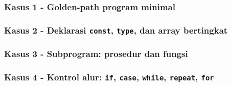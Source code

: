 \documentclass[11pt,a4paper]{article}
\begin{document}
\subsubsection*{Kasus 1 - Golden-path program minimal}





\subsubsection*{Kasus 2 - Deklarasi \texttt{const}, \texttt{type}, dan array bertingkat}





\subsubsection*{Kasus 3 - Subprogram: prosedur dan fungsi}





\subsubsection*{Kasus 4 - Kontrol alur: \texttt{if}, \texttt{case}, \texttt{while}, \texttt{repeat}, \texttt{for}}
\end{document}
